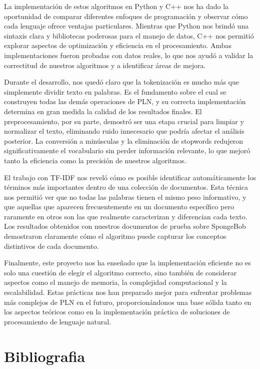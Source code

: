 \documentclass[12pt,a4paper]{article}
\begin{document}
La implementación de estos algoritmos en Python y C++ nos ha dado la oportunidad de comparar diferentes enfoques de programación y observar cómo cada lenguaje ofrece ventajas particulares. Mientras que Python nos brindó una sintaxis clara y bibliotecas poderosas para el manejo de datos, C++ nos permitió explorar aspectos de optimización y eficiencia en el procesamiento. Ambas implementaciones fueron probadas con datos reales, lo que nos ayudó a validar la correctitud de nuestros algoritmos y a identificar áreas de mejora.

Durante el desarrollo, nos quedó claro que la tokenización es mucho más que simplemente dividir texto en palabras. Es el fundamento sobre el cual se construyen todas las demás operaciones de PLN, y su correcta implementación determina en gran medida la calidad de los resultados finales. El preprocesamiento, por su parte, demostró ser una etapa crucial para limpiar y normalizar el texto, eliminando ruido innecesario que podría afectar el análisis posterior. La conversión a minúsculas y la eliminación de stopwords redujeron significativamente el vocabulario sin perder información relevante, lo que mejoró tanto la eficiencia como la precisión de nuestros algoritmos.

El trabajo con TF-IDF nos reveló cómo es posible identificar automáticamente los términos más importantes dentro de una colección de documentos. Esta técnica nos permitió ver que no todas las palabras tienen el mismo peso informativo, y que aquellas que aparecen frecuentemente en un documento específico pero raramente en otros son las que realmente caracterizan y diferencian cada texto. Los resultados obtenidos con nuestros documentos de prueba sobre SpongeBob demostraron claramente cómo el algoritmo puede capturar los conceptos distintivos de cada documento.

Finalmente, este proyecto nos ha enseñado que la implementación eficiente no es solo una cuestión de elegir el algoritmo correcto, sino también de considerar aspectos como el manejo de memoria, la complejidad computacional y la escalabilidad. Estas prácticas nos han preparado mejor para enfrentar problemas más complejos de PLN en el futuro, proporcionándonos una base sólida tanto en los aspectos teóricos como en la implementación práctica de soluciones de procesamiento de lenguaje natural.

\newpage

\section{Bibliografia}
\end{document}
